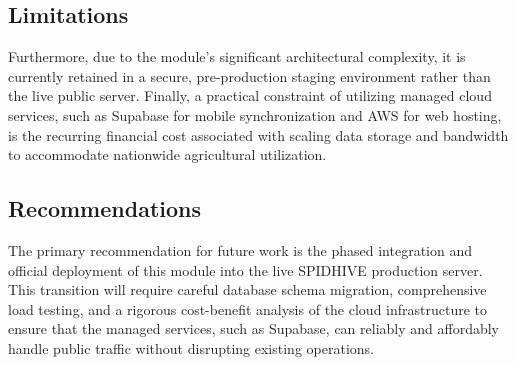 \documentclass[journal]{./IEEE/IEEEtran}
\begin{document}
\subsection{Limitations}
Furthermore, due to the module's significant architectural complexity, it is currently retained in a secure, pre-production staging environment rather than the live public server. Finally, a practical constraint of utilizing managed cloud services, such as Supabase for mobile synchronization and AWS for web hosting, is the recurring financial cost associated with scaling data storage and bandwidth to accommodate nationwide agricultural utilization.

\subsection{Recommendations}
The primary recommendation for future work is the phased integration and official deployment of this module into the live SPIDHIVE production server. This transition will require careful database schema migration, comprehensive load testing, and a rigorous cost-benefit analysis of the cloud infrastructure to ensure that the managed services, such as Supabase, can reliably and affordably handle public traffic without disrupting existing operations.




\end{document}
